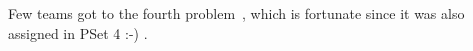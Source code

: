 \documentclass[handout]{mcs}
\begin{document}



\begin{problem}
Few teams got to the fourth problem~, which is
fortunate since it was also assigned in PSet 4 :-) .
\end{problem}

\end{document}
